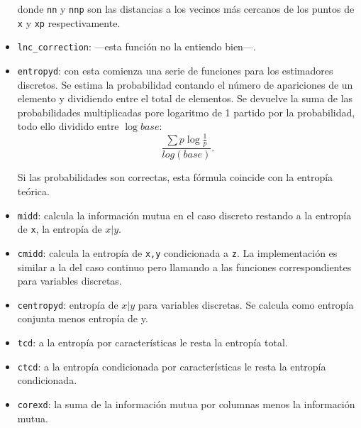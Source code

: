 \documentclass[10pt,a4paper]{article} %
\theoremstyle{definition}
\begin{document}
\begin{itemize}
donde \texttt{nn} y \texttt{nnp} son las distancias a los vecinos más cercanos de los puntos de \texttt{x} y \texttt{xp} respectivamente.

\item \texttt{lnc\_correction}: ---esta función no la entiendo bien---.

\item \texttt{entropyd}: con esta comienza una serie de funciones para los estimadores discretos. Se estima la probabilidad contando el número de apariciones de un elemento y dividiendo entre el total de elementos. Se devuelve la suma de las probabilidades multiplicadas pore logaritmo de 1 partido por la probabilidad, todo ello dividido entre $\log base$:\[
\frac{\sum p \log \frac{1}{p}}{log(base)}.
\]

Si las probabilidades son correctas, esta fórmula coincide con la entropía teórica.

\item \texttt{midd}: calcula la información mutua en el caso discreto restando a la entropía de \texttt{x}, la entropía de $x|y$.

\item \texttt{cmidd}: calcula la entropía de \texttt{x,y} condicionada a \texttt{z}. La implementación es similar a la del caso continuo pero llamando a las funciones correspondientes para variables discretas.

\item \texttt{centropyd}: entropía de $x|y$ para variables discretas. Se calcula como entropía conjunta menos entropía de y.

\item \texttt{tcd}: a la entropía por características le resta la entropía total.

\item \texttt{ctcd}:  a la entropía condicionada por características le resta la entropía condicionada.

\item \texttt{corexd}: la suma de la información mutua por columnas menos la información mutua.


\end{itemize}
\end{document}
